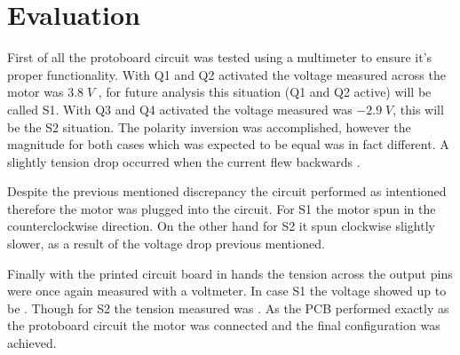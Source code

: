\section{\textbf{Evaluation}}\label{sec:5}

	First of all the protoboard circuit  was tested using a multimeter to ensure it's proper functionality. With Q1 and Q2 activated the voltage measured across the motor was $3.8\;V$ , for future analysis this situation (Q1 and Q2 active) will be called S1. With Q3 and Q4 activated the voltage measured was $-2.9\;V$, this will be the S2 situation. The polarity inversion was accomplished, however the magnitude for both cases which was expected to be equal was in fact different. A slightly tension drop occurred when the current flew backwards . 
	
	Despite the previous mentioned discrepancy the circuit performed as intentioned therefore the motor was plugged into the circuit. For S1 the motor spun in the counterclockwise direction. On the other hand for S2 it spun clockwise slightly slower, as a result of the voltage drop previous mentioned.
	
	Finally with the printed circuit board in hands the tension across the output pins were once again measured with a voltmeter. In case S1 the voltage showed up to be . Though for S2 the tension measured was . As the PCB performed exactly as the protoboard circuit the motor was connected and the final configuration was achieved. 
